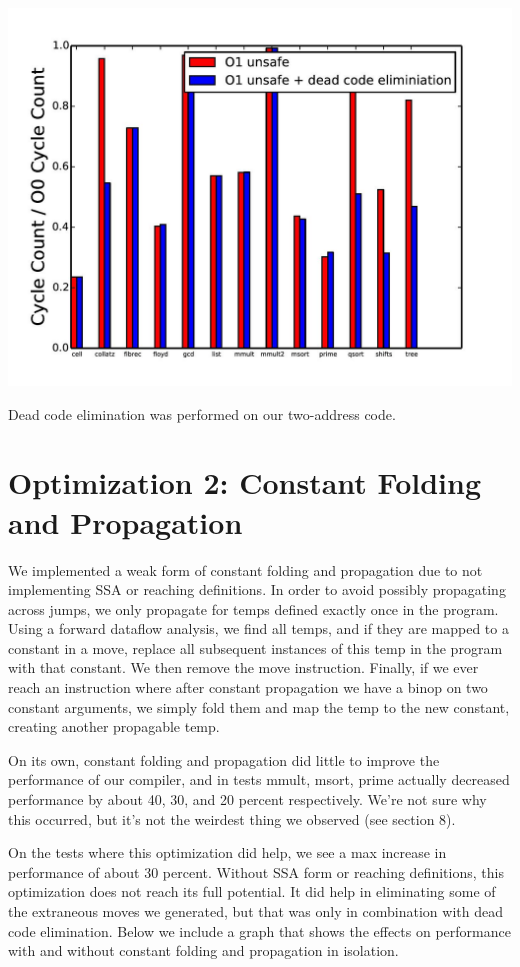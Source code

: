 \documentclass{article}
\begin{document}
\includegraphics[scale=0.5]{O1_vs_deadcode-page-001}

Dead code elimination was performed on our two-address code.

\section{Optimization 2: Constant Folding and Propagation}

We implemented a weak form of constant folding and propagation due to not implementing SSA or reaching definitions. In order to avoid possibly propagating across jumps, we only propagate for temps defined exactly once in the program. Using a forward dataflow analysis, we find all temps, and if they are mapped to a constant in a move, replace all subsequent instances of this temp in the program with that constant. We then remove the move instruction. Finally, if we ever reach an instruction where after constant propagation we have a binop on two constant arguments, we simply fold them and map the temp to the new constant, creating another propagable temp.

On its own, constant folding and propagation did little to improve the performance of our compiler, and in tests mmult, msort, prime actually decreased performance by about 40, 30, and 20 percent respectively. We're not sure why this occurred, but it's not the weirdest thing we observed (see section 8).

On the tests where this optimization did help, we see a max increase in performance of about 30 percent. Without SSA form or reaching definitions, this optimization does not reach its full potential. It did help in eliminating some of the extraneous moves we generated, but that was only in combination with dead code elimination. Below we include a graph that shows the effects on performance with and without constant folding and propagation in isolation.
\end{document}

